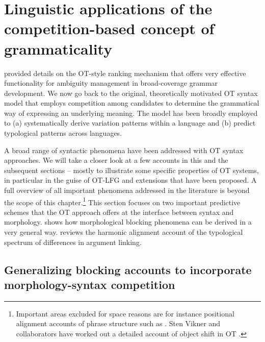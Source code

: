 \documentclass[output=paper,hidelinks]{langscibook}
\begin{document}
\section{Linguistic applications of the competition-based concept of grammaticality}
\label{sec:OT:ling-app}

 provided details on the OT-style ranking mechanism that offers very effective functionality for ambiguity management in broad-coverage grammar development.
We now go back to the original, theoretically motivated OT syntax model that employs competition among candidates to determine the grammatical way of expressing an underlying meaning.
The model has been broadly employed to (a) systematically derive variation patterns within a language and (b) predict typological patterns across languages.

A broad range of syntactic phenomena have been addressed with OT syntax approaches. We will take a closer look at a few accounts in this and the subsequent sections -- mostly to illustrate some specific properties of OT systems, in particular in the guise of OT-LFG and extensions that have been proposed. A full overview of all important phenomena addressed in the literature is beyond the scope of this chapter.\footnote{Important areas excluded for space reasons are for instance positional alignment accounts of phrase structure such as \citet{Sells1999,sellssao}. Sten Vikner and collaborators have worked out a detailed account of object shift in OT \citep{Vikner2001,EngelsVikner2014}.} 
This section focuses on two important predictive schemes that the OT approach offers at the interface between syntax and morphology. 
 shows how morphological blocking phenomena can be derived in a very general way.  reviews the harmonic alignment account of the typological spectrum of differences in argument linking.

\subsection{Generalizing blocking accounts to incorporate morphology-syntax competition}
\label{sec:OT:blocking}
\end{document}
